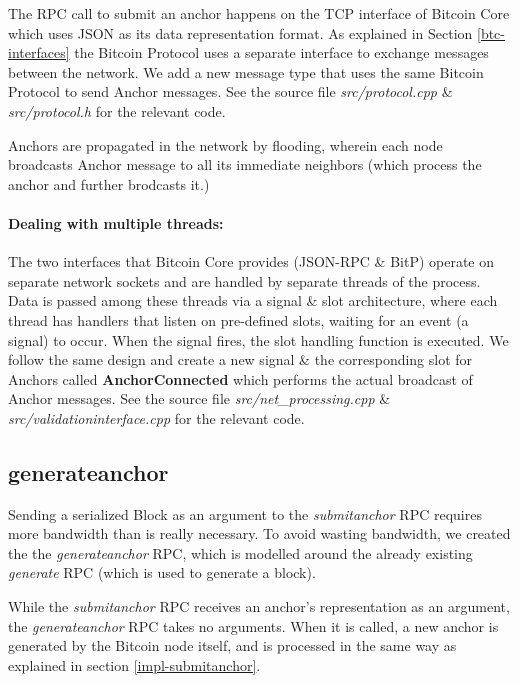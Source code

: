 The RPC call to submit an anchor happens on the TCP interface of Bitcoin Core which uses JSON as its data representation format. As explained in Section \ref{btc-interfaces} the Bitcoin Protocol uses a separate interface to exchange messages between the network. 
We add a new message type that uses the same Bitcoin Protocol to send Anchor messages. 
See the source file \textit{src/protocol.cpp} \& \textit{src/protocol.h} for the relevant code.

Anchors are propagated in the network by flooding, wherein each node broadcasts Anchor message to all its immediate neighbors (which process the anchor and further brodcasts it.)


\paragraph{Dealing with multiple threads:} 
The two interfaces that Bitcoin Core provides (JSON-RPC \& BitP) operate on separate network sockets and are handled by separate threads of the process. 
Data is passed among these threads via a signal \& slot architecture, where each thread has handlers that listen on pre-defined slots, waiting for an event (a signal) to occur. When the signal fires, the slot handling function is executed.
We follow the same design and create a new signal \& the corresponding slot for Anchors called \textbf{AnchorConnected} which performs the actual broadcast of Anchor messages.
See the source file \textit{src/net\_processing.cpp} \& \textit{src/validationinterface.cpp} for the relevant code.


\subsection{generateanchor} \label{impl-generateanchor}

Sending a serialized Block as an argument to the \textit{submitanchor} RPC requires more bandwidth than is really necessary. To avoid wasting bandwidth, we created the the \textit{generateanchor} RPC, which is modelled around the already existing \textit{generate} RPC (which is used to generate a block). 

While the \textit{submitanchor} RPC receives an anchor's representation as an argument, the \textit{generateanchor} RPC takes no arguments. When it is called, a new anchor is generated by the Bitcoin node itself, and is processed in the same way as explained in section \ref{impl-submitanchor}.


